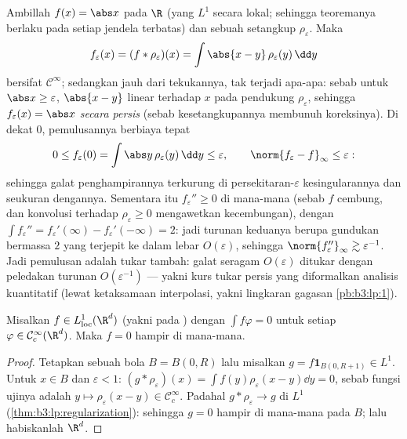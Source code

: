 \begin{example}
\label{ex:b3:lp:mollifyexample}
Ambillah $f(x) = \abs x$ pada $\R$ (yang $L^1$ secara lokal; sehingga teoremanya
berlaku pada setiap jendela terbatas) dan sebuah  setangkup
$\rho_\varepsilon$. Maka
\[
f_\varepsilon(x) = (f * \rho_\varepsilon)(x)
= \int\abs{x - y}\,\rho_\varepsilon(y)\,\dd y
\]
bersifat $\mathcal C^\infty$; sedangkan jauh dari tekukannya, tak terjadi apa-apa:
sebab untuk $\abs x \geq \varepsilon$, $\abs{x - y}$ linear terhadap $x$
pada pendukung $\rho_\varepsilon$, sehingga $f_\varepsilon(x) =
\abs x$ \emph{secara persis} (sebab kesetangkupannya membunuh koreksinya).
Di dekat $0$, pemulusannya berbiaya tepat
\[
0 \leq f_\varepsilon(0) = \int\abs
y\,\rho_\varepsilon(y)\,\dd y \leq \varepsilon,
\qquad
\norm{f_\varepsilon - f}_\infty \leq \varepsilon :
\]
sehingga galat penghampirannya terkurung di
persekitaran-$\varepsilon$ kesingularannya dan seukuran
dengannya. Sementara itu $f_\varepsilon'' \geq 0$ di mana-mana
(sebab $f$ cembung, dan konvolusi terhadap $\rho_\varepsilon
\geq 0$ mengawetkan kecembungan), dengan $\int f_\varepsilon'' =
f_\varepsilon'(\infty) - f_\varepsilon'(-\infty) = 2$: jadi
turunan keduanya berupa gundukan bermassa $2$ yang terjepit ke dalam lebar
$O(\varepsilon)$, sehingga $\norm{f_\varepsilon''}_\infty \gtrsim
\varepsilon^{-1}$. Jadi pemulusan adalah tukar tambah: galat seragam
$O(\varepsilon)$ ditukar dengan peledakan turunan
$O(\varepsilon^{-1})$ --- yakni kurs tukar persis yang
diformalkan analisis kuantitatif (lewat ketaksamaan interpolasi,
yakni lingkaran gagasan \cref{pb:b3:lp:1}).
\end{example}

\begin{corollary}\label{cor:b3:lp:fundlemma}
Misalkan $f \in L^1_{\mathrm{loc}}(\R^d)$ (yakni  pada )
dengan $\int f\varphi = 0$ untuk setiap $\varphi \in \mathcal
C^\infty_c(\R^d)$. Maka $f = 0$ hampir di mana-mana.
\end{corollary}

\begin{proof}
Tetapkan sebuah bola $B = B(0, R)$ lalu misalkan $g = f\mathbf 1_{B(0, R+1)}
\in L^1$. Untuk $x \in B$ dan $\varepsilon < 1$: $(g *
\rho_\varepsilon)(x) = \int f(y)\rho_\varepsilon(x - y)\dd y =
0$, sebab fungsi ujinya adalah $y \mapsto \rho_\varepsilon(x-y)
\in \mathcal C_c^\infty$. Padahal $g * \rho_\varepsilon \to g$ di
$L^1$ (\cref{thm:b3:lp:regularization}): sehingga $g = 0$ hampir di mana-mana pada $B$;
lalu habiskanlah $\R^d$.
\end{proof}


